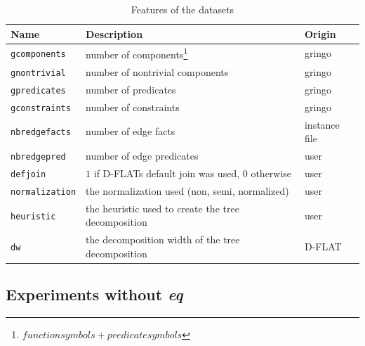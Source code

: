 \begin{table}
	\center
	\begin{tabular}{|l|l|l|}
		\hline
		Name & Description & Origin \\
		\hline
		\lstinline$gcomponents$ & number of components\footnote{$function symbols+ predicate symbols$} & gringo\\
		\lstinline$gnontrivial$ & number of nontrivial components & gringo\\
		\lstinline$gpredicates$ & number of predicates & gringo \\
		\lstinline$gconstraints$ & number of constraints & gringo\\
		\lstinline$nbredgefacts$ & number of edge facts & instance file\\
		\lstinline$nbredgepred$ & number of edge predicates & user \\
		\lstinline$defjoin$ & $1$ if D-FLATs default join was used, $0$ otherwise & user\\
		\lstinline$normalization$ & the normalization used (non, semi, normalized) & user\\
		\lstinline$heuristic$ & the heuristic used to create the tree decomposition & user\\
		\lstinline$dw$ & the decomposition width of the tree decomposition & D-FLAT\\
		\hline
	\end{tabular}
	\caption{Features of the datasets}
	\label{tbl:mlFeat}
\end{table}

\subsection{Experiments without \emph{eq}}
